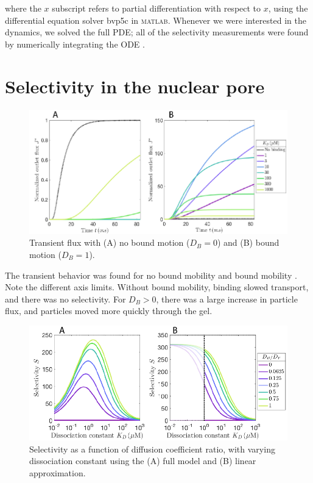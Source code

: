 %
where the $x$ subscript refers to partial differentiation with respect to $x$,
using the differential equation solver bvp5c in \textsc{matlab}.  Whenever we
were interested in the dynamics, we solved the full PDE\@; all of the
selectivity measurements were found by numerically integrating the ODE
.


\section{Selectivity in the nuclear pore}

\begin{figure}[!t]
  \begin{center}
    \includegraphics[width=150mm]{figs/ch03_bio/biofilter_jvst.png}
  \end{center}
	\caption[Transient flux]
  {Transient flux with (A) no bound motion ($D_B = 0$) and (B) bound motion 
    ($D_B=1$).}\label{fig:bio_jvst}
\end{figure}

The transient behavior was found for no bound mobility 
and bound mobility . Note the different axis limits.
Without bound mobility, binding slowed transport, and there was no selectivity.
For $D_B > 0$, there was a large increase in particle flux, and particles moved
more quickly through the gel. 

\begin{figure}[!b]
  \begin{center}
    \includegraphics[width=150mm]{figs/ch03_bio/biofilter_sel.png}
  \end{center}
	\caption[Selectivity versus dissociation constant]
  {Selectivity as a function of diffusion coefficient
  ratio, with varying dissociation constant using the (A)
  full model and (B) linear approximation.}\label{fig:bio_sel}
\end{figure}


